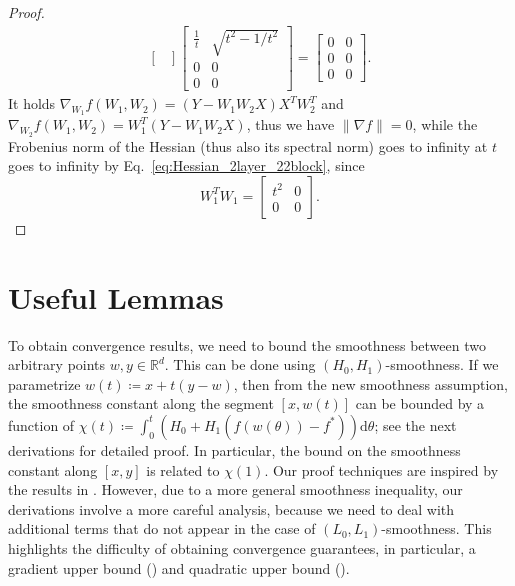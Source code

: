 \documentclass[a4paper,11pt]{article}
\newcommand{\R}{\mathbb{R}}
\newcommand{\diff}{\mathrm{d}}
\newcommand{\1}{\mathbbm{1}}
\newcommand{\eqdef}{\coloneqq}
\theoremstyle{plain}
\begin{document}
\begin{proof}
\begin{align*}
\begin{bmatrix}
 \end{bmatrix} \begin{bmatrix}
       \frac{1}{t} & \sqrt{t^2 - 1/t^2} \\ 0  & 0 \\ 0 & 0   
    \end{bmatrix} = \begin{bmatrix}
     0 & 0  \\ 0 & 0  \\ 0 & 0
 \end{bmatrix}. 
 \end{align*}
 It holds $\nabla_{W_1} f(W_1,W_2) = (Y - W_1 W_2 X) X^T W_2^T$ and $\nabla_{W_2} f (W_1, W_2) = W_1^T (Y - W_1 W_2 X)$, thus we have $\|\nabla f\| = 0$, while the Frobenius norm of the Hessian (thus also its spectral norm) goes to infinity at $t$ goes to infinity by Eq.~\eqref{eq:Hessian_2layer_22block}, since
 \begin{equation*}
     W_1^T  W_1 = \begin{bmatrix}
         t^2 & 0 \\ 0 & 0
     \end{bmatrix}.
 \end{equation*}
\end{proof}


\section{Useful Lemmas}
\label{sec:useful_lemmas}




To obtain convergence results, we need to bound the smoothness between two arbitrary points $w,y\in\R^d$. This can be done using $(H_0,H_1)$-smoothness. If we parametrize $w(t) \eqdef x + t(y-w)$, then from the new smoothness assumption, the smoothness constant along the segment $[x,w(t)]$ can be bounded by a function of $\chi(t) \eqdef \int_0^t (H_0 + H_1(f(w(\theta))-f^*))\diff \theta$; see the next derivations for detailed proof. In particular, the bound on the smoothness constant along $[x,y]$ is related to $\chi(1).$ Our proof techniques are inspired by the results in \citet{li2023convex}. However, due to a more general smoothness inequality, our derivations involve a more careful analysis, because we need to deal with additional terms that do not appear in the case of $(L_0, L_1)$-smoothness. This highlights the difficulty of obtaining convergence guarantees, in particular, a gradient upper bound () and quadratic upper bound ().
\end{document}
